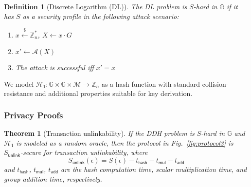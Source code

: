 \documentclass{article}
\newtheorem{definition}{Definition}[section]
\newtheorem{theorem}{Theorem}[section]
\begin{document}
\begin{definition}[Discrete Logarithm (DL)]
The DL problem is $S$-hard in $\mathbb{G}$ if it has $S$ as a security profile in the following attack scenario:
\begin{enumerate}
\item $x \stackrel{\$}{\leftarrow} \mathbb{Z}_n^*$, $X \leftarrow x \cdot G$
\item $x' \gets \mathcal{A}(X)$
\item The attack is successful iff $x' = x$
\end{enumerate}
\end{definition}

We model $\mathcal{H}_1 \colon \mathbb{G} \times \mathbb{G} \times \mathcal{M} \to \mathbb{Z}_n$ as a hash function with standard collision-resistance and additional properties suitable for key derivation.

\subsubsection{Privacy Proofs}

\begin{theorem}[Transaction unlinkability]
\label{thm:transaction-unlinkability}
If the DDH problem is $S$-hard in $\mathbb{G}$ and $\mathcal{H}_1$ is modeled as a random oracle, then the protocol in Fig.~\ref{fig:protocol3} is $S_\mathsf{unlink}$-secure for transaction unlinkability, where
$$S_\mathsf{unlink}(\epsilon) = S(\epsilon) - t_\mathsf{hash} - t_\mathsf{mul} - t_\mathsf{add}$$
and $t_\mathsf{hash}$, $t_\mathsf{mul}$, $t_\mathsf{add}$ are the hash computation time, scalar multiplication time, and group addition time, respectively.
\end{theorem}
\end{document}
